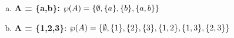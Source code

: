 \documentclass{article}
\begin{document}
\begin{enumerate}
\begin{itemize}
\begin{math}
      \end{math}
    \end{itemize}
    \begin{enumerate}[(a)]
      \item \textbf{A = \{a,b\}:}
      \begin{math}
        \\ \wp(A) = \{\emptyset, \{a\},\{b\},\{a,b\}\}
      \end{math}
      \item \textbf{A = \{1,2,3\}}:
      \begin{math}
        \\ \wp(A)= \{\emptyset, \{1\}, \{2\}, \{3\}, \{1,2\}, \{1,3\}, \{2,3\} \}
      \end{math}
    \end{enumerate}
  \end{enumerate}
\end{document}

